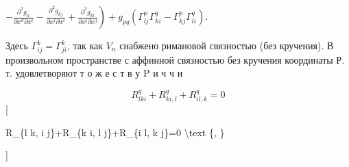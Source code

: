 \documentclass[10pt]{article}
\begin{document}
$\left.-\frac{\partial^{2} g_{l i}}{\partial x^{k} \partial x^{i}}-\frac{\partial^{2} g_{k j}}{\partial x^{l} \partial x^{i}}+\frac{\partial^{2} g_{k i}}{\partial x^{l} \partial x^{j}}\right)+g_{p q}\left(\Gamma_{l j}^{p} \Gamma_{k i}^{q}-\Gamma_{k j}^{p} \Gamma_{l i}^{q}\right)$.



Здесь $\Gamma_{i j}^{k}=\Gamma_{j i}^{k}$, так как $V_{n}$ снабжено римановой связностью (без кручения). В произвольном пространстве с аффинной связностью без кручения координаты Р. т. удовлетворяют т о ж е с т в у $\mathrm{P}$ и ч ч и



\[

R_{l k i}^{q}+R_{k i, l}^{q}+R_{i l, k}^{q}=0

\][



R\_\{l k, i j\}+R\_\{k i, l j\}+R\_\{i l, k j\}=0 \textbackslash text \{, \}

]
\end{document}
